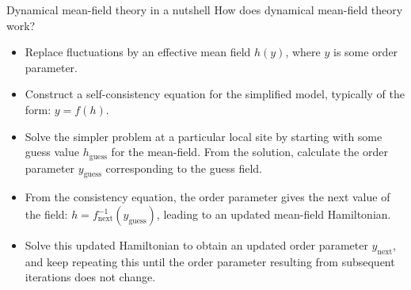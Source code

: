 \documentclass[9pt,aspectratio=169]{beamer}
\begin{document}
\begin{frame}{Dynamical mean-field theory in a nutshell}
How does \alert{dynamical} mean-field theory work?
\begin{itemize}[<+->]
	\item Replace fluctuations by an \alert{effective mean field} $h(y)$, where \(y\) is some order parameter.
		\\[10pt]
\item Construct a \alert{self-consistency equation} for the simplified model, typically of the form: $y = f(h)$.
	\\[10pt]
\item Solve the simpler problem at a particular local site by starting with some \alert{guess value \(h_\text{guess}\) for the mean-field}. From the solution, calculate the order parameter \(y_\text{guess}\) corresponding to the guess field.
	\\[10pt]
\item From the consistency equation, the order parameter gives the next value of the field: \(h = f^{-1}_\text{next}(y_\text{guess})\), leading to an \alert{updated mean-field Hamiltonian}.
	\\[10pt]
\item Solve this updated Hamiltonian to obtain an updated order parameter $y_\text{next}$, and \alert{keep repeating} this until the order parameter resulting from subsequent iterations does not change.
\end{itemize}
	
\end{frame}
\end{document}

